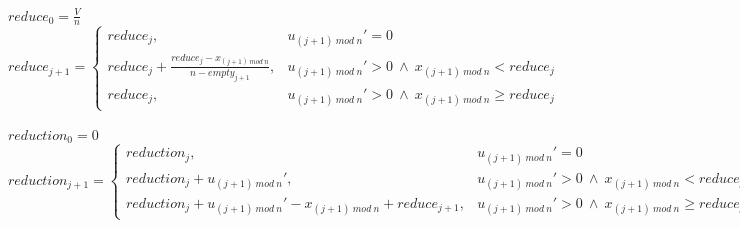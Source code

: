 \documentclass[11pt]{article}
\theoremstyle{definition}
\theoremstyle{corollary}
\begin{document}
       $reduce_0 = \frac{V}{n}$ \\
       $reduce_{j+1} =
          \begin{cases}
             reduce_j, & u_{(j+1)\:mod\:n}' = 0 \\
             reduce_j + \frac{reduce_j-x_{(j+1)\:mod\:n}}{n-empty_{j+1}}, & u_{(j+1)\:mod\:n}' > 0 \: \wedge \:
                x_{(j+1) \:mod\:n} < reduce_j \\
             reduce_j, & u_{(j+1)\:mod\:n}' > 0 \: \wedge \: x_{(j+1) \:mod\:n} \geq reduce_j
          \end{cases}$ \\ \ \\
       $reduction_0 = 0$ \\
       $reduction_{j+1} =
          \begin{cases}
             reduction_j, & u_{(j+1)\:mod\:n}' = 0 \\
             reduction_j + u_{(j+1)\:mod\:n}', & u_{(j+1)\:mod\:n}' > 0 \: \wedge \: x_{(j+1) \:mod\:n} < reduce_j \\
             reduction_j + u_{(j+1)\:mod\:n}' - x_{(j+1)\:mod\:n} + reduce_{j+1}, &
                u_{(j+1)\:mod\:n}' > 0 \: \wedge \: x_{(j+1) \:mod\:n} \geq reduce_j
          \end{cases}$
\end{document}
